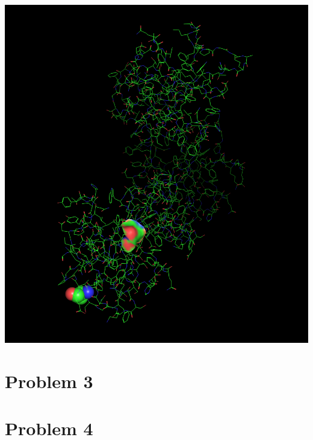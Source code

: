 \documentclass[11pt]{article}
\begin{document}
\begin{center}
\includegraphics[width=.9\linewidth]{./protein.png}
\end{center}

\section{Problem 3}
\label{sec:orge1d5933}


\section{Problem 4}
\label{sec:orgeb77df6}
\end{document}
